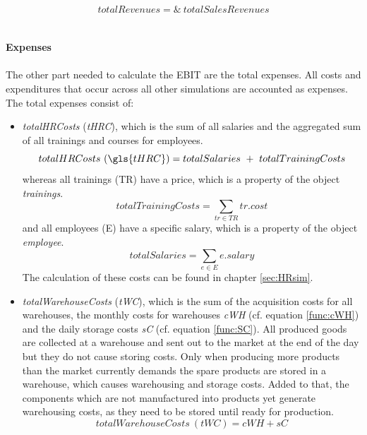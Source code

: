 \begin{equation}
\label{func:totalRevenue}
    totalRevenues = \& ~totalSalesRevenues 
\end{equation}\\
\\
\textbf{Expenses}\\
\\
The other part needed to calculate the EBIT are the total expenses. All costs and expenditures that occur across all other simulations are accounted as expenses. The total expenses consist of:
\begin{itemize}
    \item \textit{totalHRCosts} (\textit{tHRC}), which is the sum of all salaries and the aggregated sum of all trainings and courses for employees. 
    \begin{equation}
        totalHRCosts~(\gls{tHRC}) = totalSalaries \ + \  totalTrainingCosts
    \end{equation}
    whereas all trainings (\gls{TR}) have a price, which is a property of the object \textit{trainings}.
    \begin{equation}
        totalTrainingCosts = \sum_{tr \in TR} tr.cost
    \end{equation}
    and all employees (\gls{E}) have a specific salary, which is a property of the object \textit{employee}.
     \begin{equation}
        totalSalaries = \sum_{e\in E} e.salary
    \end{equation}
    The calculation of these costs can be found in chapter \ref{sec:HRsim}.
    \item \textit{totalWarehouseCosts} (\textit{tWC}), which is the sum of the acquisition costs %
    for all warehouses, the monthly costs for warehouses \textit{cWH} (cf. equation \ref{func:cWH}) and the daily storage costs \textit{sC} (cf. equation \ref{func:SC}). All produced goods are collected at a warehouse and sent out to the market at the end of the day but they do not cause storing costs. Only when producing more products than the market currently demands the spare products are stored in a warehouse, which causes warehousing and storage costs. Added to that, the components which are not manufactured into products yet generate warehousing costs, as they need to be stored until ready for production. 
    \begin{equation}
        totalWarehouseCosts~(tWC) = cWH + sC

\end{equation}
\end{itemize}
